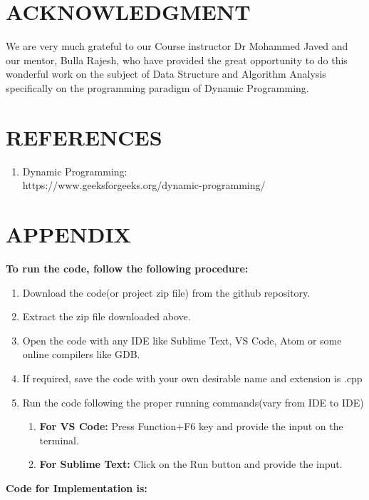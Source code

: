 \documentclass[10pt]{article}
\begin{document}
\begin{multicols*}{2}
\section*{ACKNOWLEDGMENT}

We are very much grateful to our Course instructor Dr Mohammed Javed and our mentor, Bulla Rajesh, who have provided the great opportunity to do this wonderful work on the subject of Data Structure and Algorithm Analysis specifically on the programming paradigm of Dynamic Programming.

\section*{REFERENCES}

\begin{enumerate}
\item Dynamic Programming:\\
https://www.geeksforgeeks.org/dynamic-programming/
\end{enumerate}
\end{multicols*}

\newpage
\section*{APPENDIX}
\textbf{To run the code, follow the following procedure:}\\
\begin{enumerate}
    \item Download the code(or project zip file) from the github repository.
    \item Extract the zip file downloaded above.
    \item Open the code with any IDE like Sublime Text, VS Code, Atom or some online compilers like GDB.
    \item If required, save the code with your own desirable name and extension is .cpp
    \item Run the code following the proper running commands(vary from IDE to IDE)
    \begin{enumerate}
        \item \textbf{For VS Code:} Press Function+F6 key and provide the input on the terminal.
        \item \textbf{For Sublime Text:} Click on the Run button and provide the input.\\
    \end{enumerate}
\end{enumerate}
\textbf{Code for Implementation is:}
\end{document}
